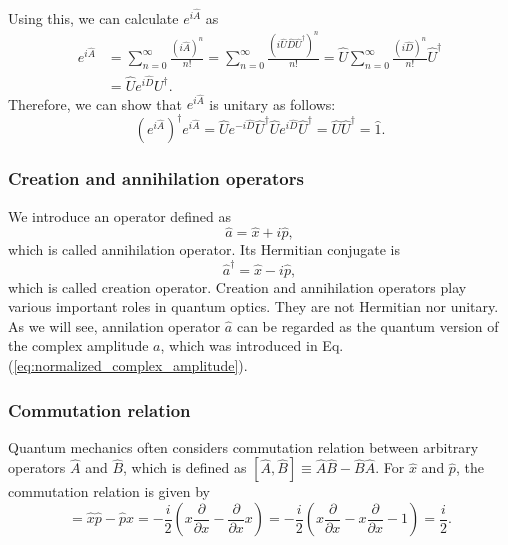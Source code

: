 Using this, we can calculate $e^{i\hat A}$ as 
\begin{equation}
\begin{aligned}
  e^{i\hat A} &= \sum_{n=0}^{\infty}\frac{\left(i\hat A\right)^n}{n!} 
  = \sum_{n=0}^{\infty}\frac{\left(i\hat U\hat D\hat U^\dagger\right)^n}{n!} = \hat U\sum_{n=0}^{\infty}\frac {(i\hat D)^n} {n!}\hat U^\dagger\\
  &= \hat U e^{i\hat D}U^\dagger.
  \label{eq:diagonalization_of_exp_Hermitian}
\end{aligned}
\end{equation}
Therefore, we can show that $e^{i\hat A}$ is unitary as follows:
\begin{equation}
\left(e^{i\hat A}\right)^\dagger e^{i\hat A} = \hat U e^{-i\hat D}\hat U^\dagger \hat U e^{i\hat D}\hat U^\dagger = \hat U \hat U^\dagger = \hat 1.
\end{equation}

\subsubsection{Creation and annihilation operators}
We introduce an operator defined as
\begin{equation}
  \hat a = \hat x + i\hat p,
\end{equation}
which is called annihilation operator.
Its Hermitian conjugate is 
\begin{equation}
  \hat a^\dagger = \hat x - i\hat p,
\end{equation}
which is called creation operator.
Creation and annihilation operators play various important roles in quantum optics. They are not Hermitian nor unitary. As we will see, annilation operator $\hat a$ can be regarded as the quantum version of the complex amplitude $a$, which was introduced in Eq. (\ref{eq:normalized_complex_amplitude}).

\subsubsection{Commutation relation}
Quantum mechanics often considers commutation relation between arbitrary operators $\hat A$ and $\hat B$, which is defined as $[\hat A, \hat B]\equiv \hat A\hat B - \hat B \hat A$. For $\hat x$ and $\hat p$, the commutation relation is given by 
\begin{equation}
  [\hat x, \hat p] = \hat x\hat p- \hat p \hat x = -\frac{i}{2}\left(x\frac{\partial}{\partial x} -  \frac{\partial}{\partial x}x\right) = -\frac{i}{2}\left(x\frac{\partial}{\partial x} -  x\frac{\partial}{\partial x} - 1\right) = \frac i 2.
  \label{eq:commutation_x_p}
\end{equation}

